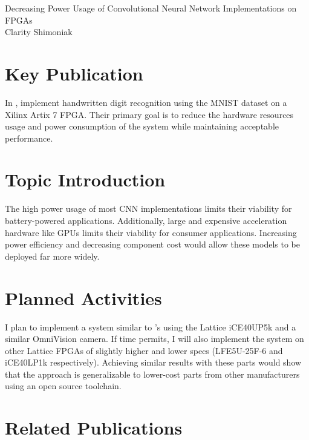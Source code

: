 \documentclass[12pt,letterpaper,english]{article}
\begin{document}
\begin{center}
	{\LARGE%
		Decreasing Power Usage of
		Convolutional Neural Network Implementations
		on FPGAs
	} \\
	\vspace{6pt}
	Clarity Shimoniak
	\vspace{-18pt}
\end{center}

\section*{Key Publication}

In  \autocite{main}, \citeauthor{main} implement handwritten
digit recognition using the MNIST dataset on a Xilinx Artix 7 FPGA. Their
primary goal is to reduce the hardware resources usage and power consumption of
the system while maintaining acceptable performance.


\section*{Topic Introduction}

The high power usage of most CNN implementations limits their viability for
battery-powered applications. Additionally, large and expensive acceleration
hardware like GPUs limits their viability for consumer applications. Increasing
power efficiency and decreasing component cost would allow these models to be
deployed far more widely.


\section*{Planned Activities}

I plan to implement a system similar to \citeauthor*{main}'s using the Lattice
iCE40UP5k and a similar OmniVision camera. If time permits, I will also
implement the system on other Lattice FPGAs of slightly higher and lower specs
(LFE5U-25F-6 and iCE40LP1k respectively). Achieving similar results with these
parts would show that the approach is generalizable to lower-cost parts from
other manufacturers using an open source toolchain.


\section*{Related Publications}
\end{document}
